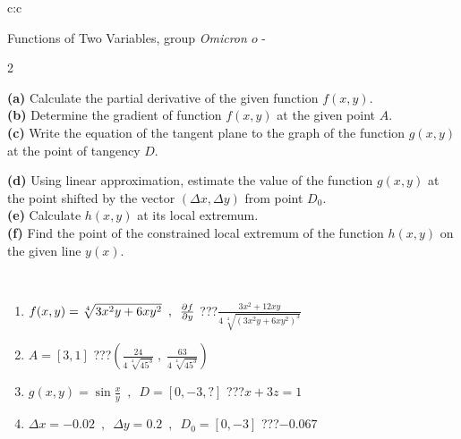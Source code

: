 \documentclass[10pt]{report}
\newcommand\omicron{o}
\begin{document}
\begin{tabular}{c:c}
\begin{minipage}[c][104.5mm][t]{0.5\linewidth}
\begin{center}
\vspace{7mm}
{\huge \LARGE Functions of Two Variables, group \textit{Omicron $\omicron$} -}\\[5mm]
\begin{minipage}{0.95\linewidth}
\begin{center}
{\small \begin{multicols}{2} \raggedright
\textbf{(a)} Calculate the partial derivative of the given function \(f(x,y)\). \\[1mm]
\textbf{(b)} Determine the gradient of function \(f(x,y)\) at the given point \(A\). \\[1mm]
\textbf{(c)} Write the equation of the tangent plane to the graph of the function \(g(x,y)\) at the point of tangency \(D\). \par \columnbreak
\textbf{(d)} Using linear approximation, estimate the value of the function \(g(x,y)\) at the point shifted by the vector \((\Delta x, \Delta y)\) from point \(D_0\). \\[1mm]
\textbf{(e)} Calculate \(h(x,y)\) at its local extremum. \\[1mm]
\textbf{(f)} Find the point of the constrained local extremum of the function \(h(x,y)\) on the given line \(y(x)\). \\[1mm]
\end{multicols}
}
\end{center}
\end{minipage}
\\[4mm]
\begin{minipage}{0.79\linewidth}
\begin{center}
\begin{varwidth}{\linewidth}
\begin{enumerate}
\normalsizerr
\item $f(x,y) = \sqrt[4]{3x^2y + 6xy^2}\enspace , \enspace \pdv{f}{y}$\quad \dotfill\; ???\;\dotfill \quad $\frac{3x^2+12xy}{4\,\sqrt[4]{(3x^2y+6xy^2)^{3}}}$
\item $A = [3, 1]$\quad \dotfill\; ???\;\dotfill \quad $\left( \frac{24}{4\,\sqrt[4]{45^3}} \;,\; \frac{63}{4\,\sqrt[4]{45^3}} \right)$
\item $g(x,y) = \sin\frac{x}{y} \enspace , \enspace D = [0, -3, ?]$\quad \dotfill\; ???\;\dotfill \quad $x+3z=1$
\item $\Delta x = {-0.02} \enspace,\enspace \Delta y = {0.2} \enspace,\enspace D_0 = [0,-3]$\quad \dotfill\; ???\;\dotfill \quad $-0.067$

\end{enumerate}
\end{varwidth}
\end{center}
\end{minipage}
\end{center}
\end{minipage}
\end{tabular}
\end{document}

